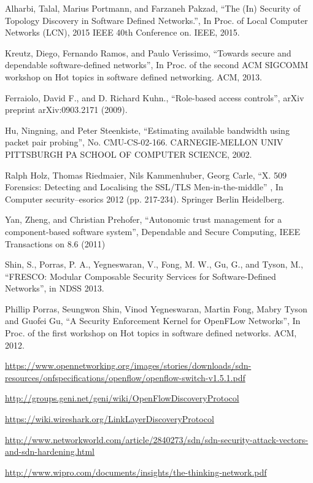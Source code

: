\begin{thebibliography}{1}
Alharbi, Talal, Marius Portmann, and Farzaneh Pakzad,
``The (In) Security of Topology Discovery in Software Defined Networks.'', In Proc. of Local Computer Networks (LCN), 2015 IEEE 40th Conference on. IEEE, 2015.

Kreutz, Diego, Fernando Ramos, and Paulo Verissimo, 
``Towards secure and dependable software-defined networks'', In Proc. of the second ACM SIGCOMM workshop on Hot topics in software defined networking. ACM, 2013.


Ferraiolo, David F., and D. Richard Kuhn., 
``Role-based access controls'', arXiv preprint arXiv:0903.2171 (2009).

\bibitem{}
Hu, Ningning, and Peter Steenkiste,
``Estimating available bandwidth using packet pair probing'', No. CMU-CS-02-166. CARNEGIE-MELLON UNIV PITTSBURGH PA SCHOOL OF COMPUTER SCIENCE, 2002.

Ralph Holz, Thomas Riedmaier, Nils Kammenhuber, Georg Carle, 
``X. 509 Forensics: Detecting and Localising the SSL/TLS Men-in-the-middle'' , In Computer security–esorics 2012 (pp. 217-234). Springer Berlin Heidelberg.

Yan, Zheng, and Christian Prehofer,
``Autonomic trust management for a component-based software system'', Dependable and Secure Computing, IEEE Transactions on 8.6 (2011)

Shin, S., Porras, P. A., Yegneswaran, V., Fong, M. W., Gu, G., and Tyson, M.,
``FRESCO: Modular Composable Security Services for Software-Defined Networks'', in NDSS 2013.

Phillip Porras, Seungwon Shin, Vinod Yegneswaran, Martin Fong, Mabry Tyson and Guofei Gu,
``A Security Enforcement Kernel for OpenFLow Networks'', In Proc. of the first workshop on Hot topics in software defined networks. ACM, 2012.

\url{https://www.opennetworking.org/images/stories/downloads/sdn-resources/onfspecifications/openflow/openflow-switch-v1.5.1.pdf}

\url{http://groups.geni.net/geni/wiki/OpenFlowDiscoveryProtocol}

\url{https://wiki.wireshark.org/LinkLayerDiscoveryProtocol}

\url{http://www.networkworld.com/article/2840273/sdn/sdn-security-attack-vectors-and-sdn-hardening.html}

\url{http://www.wipro.com/documents/insights/the-thinking-network.pdf}


\end{thebibliography}
